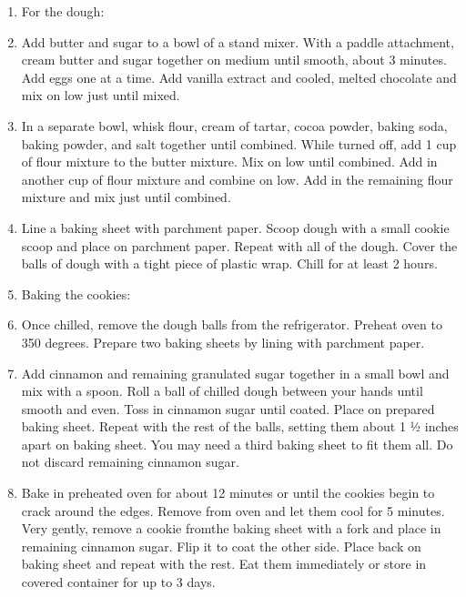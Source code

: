 \begin{footnotesize}
\begin{enumerate}
    \item For the dough:
    \item Add butter and sugar to a bowl of a stand mixer. With a paddle attachment, cream butter and sugar together on medium until smooth, about 3 minutes. Add eggs one at a time. Add vanilla extract and cooled, melted chocolate and mix on low just until mixed.
    \item In a separate bowl, whisk flour, cream of tartar, cocoa powder, baking soda, baking powder, and salt together until combined. While turned off, add 1 cup of flour mixture to the butter mixture. Mix on low until combined. Add in another cup of flour mixture and combine on low. Add in the remaining flour mixture and mix just until combined.
    \item Line a baking sheet with parchment paper. Scoop dough with a small cookie scoop and place on parchment paper. Repeat with all of the dough. Cover the balls of dough with a tight piece of plastic wrap. Chill for at least 2 hours.
    \item Baking the cookies:
    \item Once chilled, remove the dough balls from the refrigerator. Preheat oven to 350 degrees. Prepare two baking sheets by lining with parchment paper.
    \item Add cinnamon and remaining granulated sugar together in a small bowl and mix with a spoon. Roll a ball of chilled dough between your hands until smooth and even. Toss in cinnamon sugar until coated. Place on prepared baking sheet. Repeat with the rest of the balls, setting them about 1 1⁄2 inches apart on baking sheet. You may need a third baking sheet to fit them all. Do not discard remaining cinnamon sugar.
    \item Bake in preheated oven for about 12 minutes or until the cookies begin to crack around the edges. Remove from oven and let them cool for 5 minutes. Very gently, remove a cookie fromthe baking sheet with a fork and place in remaining cinnamon sugar. Flip it to coat the other side. Place back on baking sheet and repeat with the rest. Eat them immediately or store in covered container for up to 3 days.
\end{enumerate}
\end{footnotesize}

\vspace{2em}
